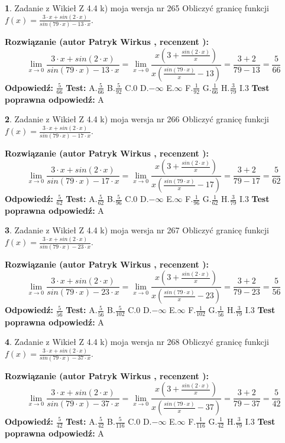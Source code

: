 \documentclass[12pt, a4paper]{article}
\theoremstyle{definition} %
\newtheorem{zad}{}
\newcommand{\zadStart}[1]{\begin{zad}#1\newline}
\newcommand{\zadStop}{\end{zad}}
\newcommand{\rozwStart}[2]{\noindent \textbf{Rozwiązanie (autor #1 , recenzent #2): }\newline}
\newcommand{\rozwStop}{\newline}
\newcommand{\odpStart}{\noindent \textbf{Odpowiedź:}\newline}
\newcommand{\odpStop}{\newline}
\newcommand{\testStart}{\noindent \textbf{Test:}\newline}
\newcommand{\testStop}{\newline}
\newcommand{\kluczStart}{\noindent \textbf{Test poprawna odpowiedź:}\newline}
\newcommand{\kluczStop}{\newline}
\begin{document}
\zadStart{Zadanie z Wikieł Z 4.4 k) moja wersja nr 265}
Obliczyć granicę funkcji $f(x)=\frac{3\cdot x +sin(2\cdot x)}{sin(79\cdot x) -13\cdot x}$.
\zadStop
\rozwStart{Patryk Wirkus}{}
$$\lim\limits_{x\to 0}\frac{3\cdot x +sin(2\cdot x)}{sin(79\cdot x) -13\cdot x}
=\lim\limits_{x\to 0}\frac{x(3+\frac{sin(2\cdot x)}{x})}{x(\frac{sin(79\cdot x)}{x}-13)}
=\frac{3+2}{79-13} = \frac{5}{66}$$
\rozwStop
\odpStart
$\frac{5}{66}$
\odpStop
\testStart
A.$\frac{5}{66}$
B.$\frac{5}{92}$
C.$0$
D.$-\infty$
E.$\infty$
F.$\frac{1}{92}$
G.$\frac{1}{66}$
H.$\frac{3}{79}$
I.$3$
\testStop
\kluczStart
A
\kluczStop



\zadStart{Zadanie z Wikieł Z 4.4 k) moja wersja nr 266}
Obliczyć granicę funkcji $f(x)=\frac{3\cdot x +sin(2\cdot x)}{sin(79\cdot x) -17\cdot x}$.
\zadStop
\rozwStart{Patryk Wirkus}{}
$$\lim\limits_{x\to 0}\frac{3\cdot x +sin(2\cdot x)}{sin(79\cdot x) -17\cdot x}
=\lim\limits_{x\to 0}\frac{x(3+\frac{sin(2\cdot x)}{x})}{x(\frac{sin(79\cdot x)}{x}-17)}
=\frac{3+2}{79-17} = \frac{5}{62}$$
\rozwStop
\odpStart
$\frac{5}{62}$
\odpStop
\testStart
A.$\frac{5}{62}$
B.$\frac{5}{96}$
C.$0$
D.$-\infty$
E.$\infty$
F.$\frac{1}{96}$
G.$\frac{1}{62}$
H.$\frac{3}{79}$
I.$3$
\testStop
\kluczStart
A
\kluczStop



\zadStart{Zadanie z Wikieł Z 4.4 k) moja wersja nr 267}
Obliczyć granicę funkcji $f(x)=\frac{3\cdot x +sin(2\cdot x)}{sin(79\cdot x) -23\cdot x}$.
\zadStop
\rozwStart{Patryk Wirkus}{}
$$\lim\limits_{x\to 0}\frac{3\cdot x +sin(2\cdot x)}{sin(79\cdot x) -23\cdot x}
=\lim\limits_{x\to 0}\frac{x(3+\frac{sin(2\cdot x)}{x})}{x(\frac{sin(79\cdot x)}{x}-23)}
=\frac{3+2}{79-23} = \frac{5}{56}$$
\rozwStop
\odpStart
$\frac{5}{56}$
\odpStop
\testStart
A.$\frac{5}{56}$
B.$\frac{5}{102}$
C.$0$
D.$-\infty$
E.$\infty$
F.$\frac{1}{102}$
G.$\frac{1}{56}$
H.$\frac{3}{79}$
I.$3$
\testStop
\kluczStart
A
\kluczStop



\zadStart{Zadanie z Wikieł Z 4.4 k) moja wersja nr 268}
Obliczyć granicę funkcji $f(x)=\frac{3\cdot x +sin(2\cdot x)}{sin(79\cdot x) -37\cdot x}$.
\zadStop
\rozwStart{Patryk Wirkus}{}
$$\lim\limits_{x\to 0}\frac{3\cdot x +sin(2\cdot x)}{sin(79\cdot x) -37\cdot x}
=\lim\limits_{x\to 0}\frac{x(3+\frac{sin(2\cdot x)}{x})}{x(\frac{sin(79\cdot x)}{x}-37)}
=\frac{3+2}{79-37} = \frac{5}{42}$$
\rozwStop
\odpStart
$\frac{5}{42}$
\odpStop
\testStart
A.$\frac{5}{42}$
B.$\frac{5}{116}$
C.$0$
D.$-\infty$
E.$\infty$
F.$\frac{1}{116}$
G.$\frac{1}{42}$
H.$\frac{3}{79}$
I.$3$
\testStop
\kluczStart
A
\kluczStop
\end{document}
